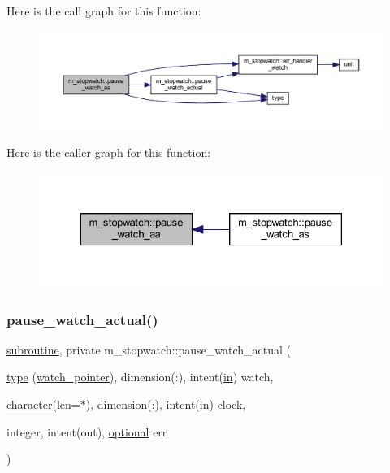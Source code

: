 Here is the call graph for this function\+:
\nopagebreak
\begin{figure}[H]
\begin{center}
\leavevmode
\includegraphics[width=350pt]{namespacem__stopwatch_a7ebcc1a6c6636aa2ff91b549b68dfcca_cgraph}
\end{center}
\end{figure}
Here is the caller graph for this function\+:
\nopagebreak
\begin{figure}[H]
\begin{center}
\leavevmode
\includegraphics[width=330pt]{namespacem__stopwatch_a7ebcc1a6c6636aa2ff91b549b68dfcca_icgraph}
\end{center}
\end{figure}
\mbox{\label{namespacem__stopwatch_a7c4ebc164b1871203ab72693f73038c0}} 
\subsubsection{\texorpdfstring{pause\+\_\+watch\+\_\+actual()}{pause\_watch\_actual()}}
{\footnotesize\ttfamily \hyperlink{M__stopwatch_83_8txt_acfbcff50169d691ff02d4a123ed70482}{subroutine}, private m\+\_\+stopwatch\+::pause\+\_\+watch\+\_\+actual (\begin{DoxyParamCaption}\item[{\hyperlink{stop__watch_83_8txt_a70f0ead91c32e25323c03265aa302c1c}{type} (\hyperlink{structm__stopwatch_1_1watch__pointer}{watch\+\_\+pointer}), dimension(\+:), intent(\hyperlink{M__journal_83_8txt_afce72651d1eed785a2132bee863b2f38}{in})}]{watch,  }\item[{\hyperlink{option__stopwatch_83_8txt_abd4b21fbbd175834027b5224bfe97e66}{character}(len=$\ast$), dimension(\+:), intent(\hyperlink{M__journal_83_8txt_afce72651d1eed785a2132bee863b2f38}{in})}]{clock,  }\item[{integer, intent(out), \hyperlink{option__stopwatch_83_8txt_aa4ece75e7acf58a4843f70fe18c3ade5}{optional}}]{err }\end{DoxyParamCaption})\hspace{0.3cm}{\ttfamily [private]}}



